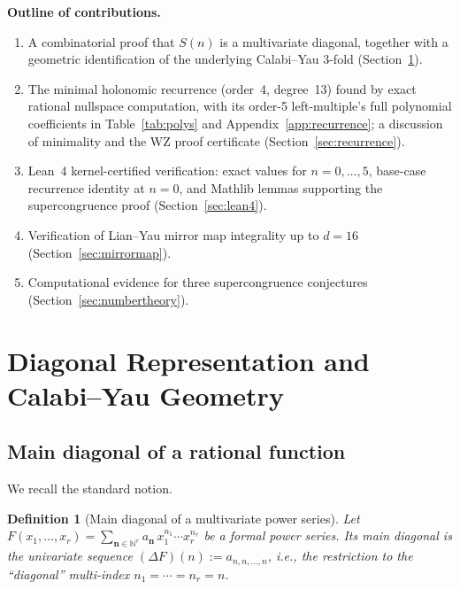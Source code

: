 \documentclass[11pt, a4paper]{article}
\newtheorem{definition}[theorem]{Definition}
\begin{document}
\medskip\noindent\textbf{Outline of contributions.}
\begin{enumerate}
    \item A combinatorial proof that $S(n)$ is a multivariate diagonal,
          together with a geometric identification of the underlying Calabi--Yau
          3-fold (Section~\ref{sec:diagonal}).
    \item The minimal holonomic recurrence (order~4, degree~13) found by
          exact rational nullspace computation, with its order-5 left-multiple's
          full polynomial coefficients in
          Table~\ref{tab:polys} and Appendix~\ref{app:recurrence}; a
          discussion of minimality and the WZ proof certificate
          (Section~\ref{sec:recurrence}).
    \item Lean~4 kernel-certified verification: exact values for
          $n=0,\dots,5$, base-case recurrence identity at $n=0$, and
          Mathlib lemmas supporting the supercongruence proof
          (Section~\ref{sec:lean4}).
    \item Verification of Lian--Yau mirror map integrality up to $d=16$
          (Section~\ref{sec:mirrormap}).
    \item Computational evidence for three supercongruence conjectures
          (Section~\ref{sec:numbertheory}).
\end{enumerate}


\section{Diagonal Representation and Calabi--Yau Geometry}%
\label{sec:diagonal}

\subsection{Main diagonal of a rational function}

We recall the standard notion.

\begin{definition}[Main diagonal of a multivariate power series]
\label{def:diagonal}
Let $F(x_1,\dots,x_r)=\sum_{\mathbf{n}\in\mathbb{N}^r}
  a_{\mathbf{n}}\,x_1^{n_1}\cdots x_r^{n_r}$ be a formal power series.
Its \emph{main diagonal} is the univariate sequence
$(\Delta F)(n) := a_{n,n,\dots,n}$, i.e., the restriction to the
``diagonal'' multi-index $n_1=\cdots=n_r=n$.
\end{definition}
\end{document}
